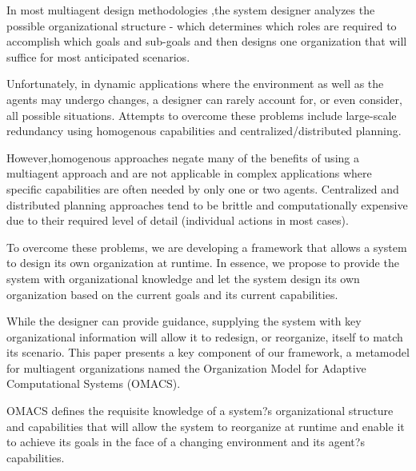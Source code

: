 In most multiagent design methodologies  ,the system designer analyzes the possible organizational 
structure - which determines which roles are required to accomplish which goals and sub-goals 
and then designs one organization that will suffice for most anticipated scenarios. 

Unfortunately, in dynamic applications where the environment as well as the agents 
may undergo changes, a designer can rarely account for, or even consider, all possible situations.
Attempts to overcome these problems include large-scale redundancy using homogenous 
capabilities and centralized/distributed planning. 

However,homogenous approaches negate many of the benefits of using a multiagent approach and are not
applicable in complex applications where specific capabilities are often needed by only one or
two agents. Centralized and distributed planning approaches tend to be brittle and
computationally expensive due to their required level of detail (individual actions in most cases).

To overcome these problems, we are developing a framework that allows a system to design its
own organization at runtime. In essence, we propose to provide the system with organizational
knowledge and let the system design its own organization based on the current goals and its
current capabilities. 

While the designer can provide guidance, supplying the system with key
organizational information will allow it to redesign, or reorganize, itself to match its scenario.
This paper presents a key component of our framework, a metamodel for multiagent
organizations named the Organization Model for Adaptive Computational Systems (OMACS).

OMACS defines the requisite knowledge of a system?s organizational structure and capabilities
that will allow the system to reorganize at runtime and enable it to achieve its goals in the face of
a changing environment and its agent?s capabilities.